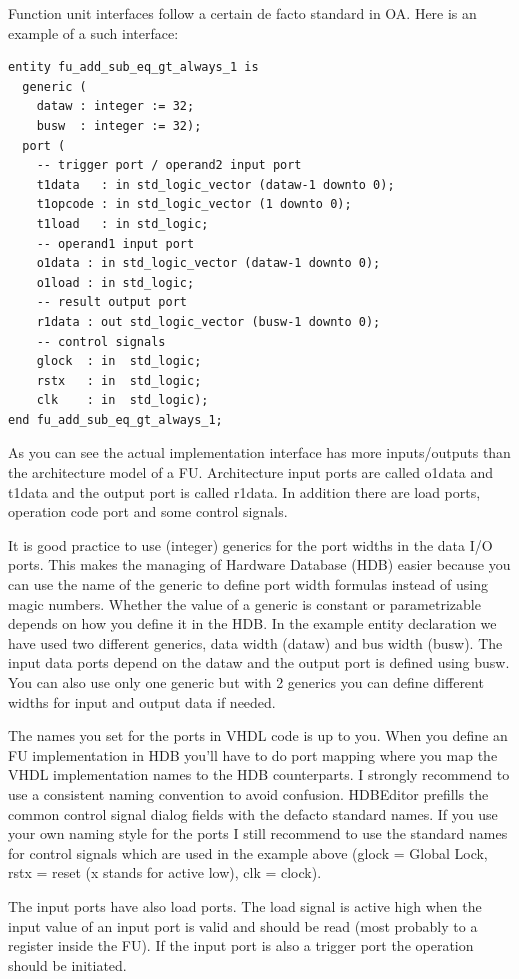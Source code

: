 \documentclass[a4paper,twoside]{tceusermanual}
\begin{document}
Function unit interfaces follow a certain de facto standard in OA. Here is
an example of a such interface:

\begin{verbatim}
entity fu_add_sub_eq_gt_always_1 is
  generic (
    dataw : integer := 32;
    busw  : integer := 32);
  port (
    -- trigger port / operand2 input port
    t1data   : in std_logic_vector (dataw-1 downto 0);
    t1opcode : in std_logic_vector (1 downto 0);
    t1load   : in std_logic;
    -- operand1 input port
    o1data : in std_logic_vector (dataw-1 downto 0);
    o1load : in std_logic;
    -- result output port
    r1data : out std_logic_vector (busw-1 downto 0);
    -- control signals
    glock  : in  std_logic;
    rstx   : in  std_logic;
    clk    : in  std_logic);
end fu_add_sub_eq_gt_always_1;
\end{verbatim}

As you can see the actual implementation interface has more inputs/outputs
than the architecture model of a FU. Architecture input ports are
called o1data and t1data and the output port is called r1data. In addition
there are load ports, operation code port and some control signals.

It is good practice to use (integer) generics for the port widths in the data
I/O ports. This makes the managing of Hardware Database (HDB) easier because
you can use the name of the generic to define port width formulas instead of
using magic numbers. Whether the value of a generic is constant or
parametrizable depends on how you define it in the HDB. In the example
entity declaration we have used two different generics, data width (dataw)
and bus width (busw). The input data ports depend on the dataw and the
output port is defined using busw. You can also use only one generic but
with 2 generics you can define different widths for input and output data if
needed.

The names you set for the ports in VHDL code is up to you. When you define
an FU implementation in HDB you'll have to do port mapping where you map the
VHDL implementation names to the HDB counterparts. I strongly recommend to
use a consistent naming convention to avoid confusion. HDBEditor prefills 
the common control signal dialog fields with the defacto standard
names. If you use your own naming style for the ports I still recommend to
use the standard names for control signals which are used in the example
above (glock = Global Lock, rstx = reset (x stands for active low), clk =
clock).

The input ports have also load ports. The load signal is active high when the
input value of an input port is valid and should be read (most probably to a
register inside the FU). If the input port is also a trigger port the
operation should be initiated.
\end{document}
